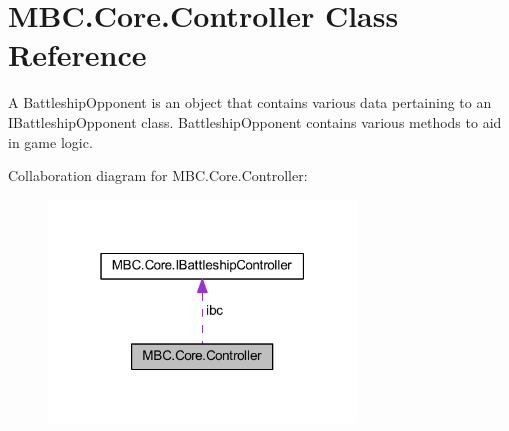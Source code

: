 \hypertarget{class_m_b_c_1_1_core_1_1_controller}{\section{M\-B\-C.\-Core.\-Controller Class Reference}
\label{class_m_b_c_1_1_core_1_1_controller}
}


A Battleship\-Opponent is an object that contains various data pertaining to an I\-Battleship\-Opponent class. Battleship\-Opponent contains various methods to aid in game logic. 




Collaboration diagram for M\-B\-C.\-Core.\-Controller\-:\nopagebreak
\begin{figure}[H]
\begin{center}
\leavevmode
\includegraphics[width=232pt]{class_m_b_c_1_1_core_1_1_controller__coll__graph}
\end{center}
\end{figure}
